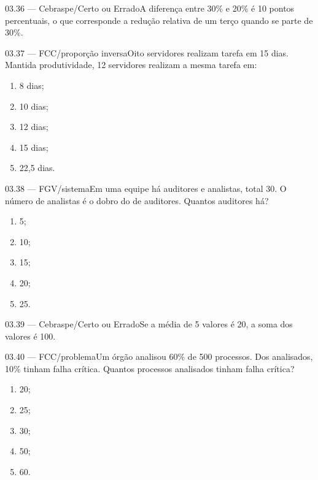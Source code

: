 \begin{questao}{ 03.36 — Cebraspe/Certo ou Errado}A diferença entre 30\% e 20\% é 10 pontos percentuais, o que corresponde a redução relativa de um terço quando se parte de 30\%.\end{questao}
\begin{questao}{ 03.37 — FCC/proporção inversa}Oito servidores realizam tarefa em 15 dias. Mantida produtividade, 12 servidores realizam a mesma tarefa em:\begin{enumerate}[label=\Alph*)]\item 8 dias;\item 10 dias;\item 12 dias;\item 15 dias;\item 22,5 dias.\end{enumerate}\end{questao}
\begin{questao}{ 03.38 — FGV/sistema}Em uma equipe há auditores e analistas, total 30. O número de analistas é o dobro do de auditores. Quantos auditores há?\begin{enumerate}[label=\Alph*)]\item 5;\item 10;\item 15;\item 20;\item 25.\end{enumerate}\end{questao}
\begin{questao}{ 03.39 — Cebraspe/Certo ou Errado}Se a média de 5 valores é 20, a soma dos valores é 100.\end{questao}
\begin{questao}{ 03.40 — FCC/problema}Um órgão analisou 60\% de 500 processos. Dos analisados, 10\% tinham falha crítica. Quantos processos analisados tinham falha crítica?\begin{enumerate}[label=\Alph*)]\item 20;\item 25;\item 30;\item 50;\item 60.\end{enumerate}\end{questao}

